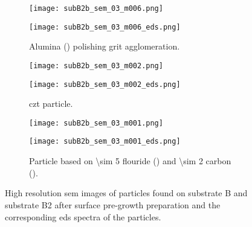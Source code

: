 \begin{figure}[htbp]
    \centering
    \begin{subfigure}[t]{\textwidth}
          \begin{minipage}[t]{0.49\linewidth}
            \centering
            \texttt{[image: subB2b\_sem\_03\_m006.png]}
          \end{minipage}
          \hfill
          \begin{minipage}[t]{0.49\linewidth}
            \centering
            \texttt{[image: subB2b\_sem\_03\_m006\_eds.png]}
          \end{minipage}
        \caption{Alumina () polishing grit agglomeration.}\label{fig:subB2b_alumina}
    \end{subfigure}
    \par\bigskip
    \begin{subfigure}[t]{\textwidth}
          \begin{minipage}[t]{0.49\linewidth}
            \centering
            \texttt{[image: subB2b\_sem\_03\_m002.png]}
          \end{minipage}
          \hfill
          \begin{minipage}[t]{0.49\linewidth}
            \centering
            \texttt{[image: subB2b\_sem\_03\_m002\_eds.png]}
          \end{minipage}
        \caption{\Ac{czt} particle.}\label{fig:subB2b_czt}
    \end{subfigure}
    \par\bigskip
    \begin{subfigure}[t]{\textwidth}
          \begin{minipage}[t]{0.49\linewidth}
            \centering
            \texttt{[image: subB2b\_sem\_03\_m001.png]}
          \end{minipage}
          \hfill
          \begin{minipage}[t]{0.49\linewidth}
            \centering
            \texttt{[image: subB2b\_sem\_03\_m001\_eds.png]}
          \end{minipage}
        \caption{Particle based on \SI{\sim 5}{} flouride () and \SI{\sim 2}{} carbon ().}\label{fig:subB2b_C2F5}
    \end{subfigure}
    \caption[\Ac{sem} images and \ac{eds} spectra of particles found on substrate B and substrate B2 after surface pre-growth preparation.]{High resolution \acf{sem} images of particles found on substrate B and substrate B2 after surface pre-growth preparation and the corresponding \acf{eds} spectra of the particles.}\label{fig:subBb_sem_w_eds}
\end{figure}

